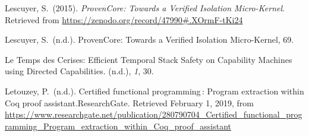 \documentclass[12pt,twoside]{article}
\begin{document}
{\begin{thebibliography}{1079}
\mdbibitemlabel{}Lescuyer, S.~(2015). \emph{ProvenCore: Towards a Verified Isolation Micro-Kernel}. Retrieved from \href{https://zenodo.org/record/47990\%23.XOrmF-tKi24}{{\ttfamily https://\hspace{0pt}zenodo.\hspace{0pt}org/\hspace{0pt}record/\hspace{0pt}47990\#.\hspace{0pt}XOrmF-\hspace{0pt}tKi24}}%

\mdbibitemlabel{}Lescuyer, S.~(n.d.). ProvenCore: Towards a Verified Isolation Micro-Kernel, 69.%

\mdbibitemlabel{}Le Temps des Cerises: Efficient Temporal Stack Safety on Capability Machines using Directed Capabilities. (n.d.), \emph{1}, 30.%

\mdbibitemlabel{}Letouzey, P.~(n.d.). Certified functional programming : Program extraction within Coq proof assistant.ResearchGate. Retrieved February 1, 2019, from \href{https://www.researchgate.net/publication/280790704_Certified_functional_programming_Program_extraction_within_Coq_proof_assistant}{{\ttfamily https://\hspace{0pt}www.\hspace{0pt}researchgate.\hspace{0pt}net/\hspace{0pt}publication/\hspace{0pt}280790704\_\hspace{0pt}Certified\_\hspace{0pt}functional\_\hspace{0pt}programming\_\hspace{0pt}Program\_\hspace{0pt}extraction\_\hspace{0pt}within\_\hspace{0pt}Coq\_\hspace{0pt}proof\_\hspace{0pt}assistant}}%


\end{thebibliography}}
\end{document}

